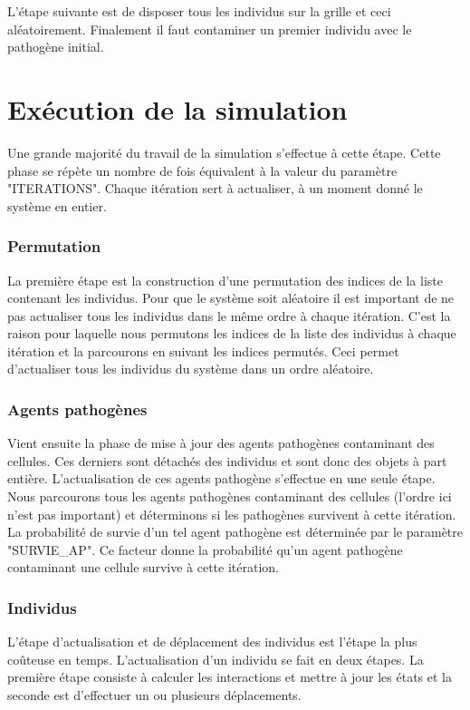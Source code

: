 L'étape suivante est de disposer tous les individus sur la grille et ceci aléatoirement. Finalement il faut contaminer un premier individu avec le pathogène initial. 

\section{Exécution de la simulation}

Une grande majorité du travail de la simulation s'effectue à cette étape. Cette phase se répète un nombre de fois équivalent à la valeur du paramètre {\small "ITERATIONS"}. Chaque itération sert à actualiser, à un moment donné le système en entier.

\subsubsection{Permutation}

La première étape est la construction d'une permutation des indices de la liste contenant les individus. Pour que le système soit aléatoire il est important de ne pas actualiser tous les individus dans le même ordre à chaque itération. C'est la raison pour laquelle nous permutons les indices de la liste des individus à chaque itération et la parcourons en suivant les indices permutés. Ceci permet d'actualiser tous les individus du système dans un ordre aléatoire.

\subsubsection{Agents pathogènes}

Vient ensuite la phase de mise à jour des agents pathogènes contaminant des cellules. Ces derniers sont détachés des individus et sont donc des objets à part entière. L'actualisation de ces agents pathogène s'effectue en une seule étape. Nous parcourons tous les agents pathogènes contaminant des cellules (l'ordre ici n'est pas important) et déterminons si les pathogènes survivent à cette itération. La probabilité de survie d'un tel agent pathogène est déterminée par le paramètre {\small "SURVIE\_AP"}. Ce facteur donne la probabilité qu'un agent pathogène contaminant une cellule survive à cette itération.

\subsubsection{Individus}

L'étape d'actualisation et de déplacement des individus est l'étape la plus coûteuse en temps. L'actualisation d'un individu se fait en deux étapes. La première étape consiste à calculer les interactions et mettre à jour les états et la seconde est d'effectuer un ou plusieurs déplacements.\\

